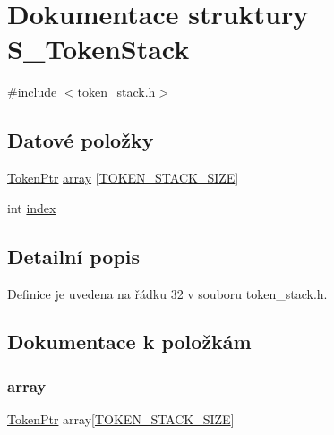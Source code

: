 \hypertarget{struct_s___token_stack}{}\section{Dokumentace struktury S\+\_\+\+Token\+Stack}
\label{struct_s___token_stack}


{\ttfamily \#include $<$token\+\_\+stack.\+h$>$}

\subsection*{Datové položky}
\begin{DoxyCompactItemize}
\item 
\hyperlink{token_8h_aa80161bf9be61c651bc95eafc643d9a5}{Token\+Ptr} \hyperlink{struct_s___token_stack_a873aa0c39fe43dcba06cdd8f8f118820}{array} \mbox{[}\hyperlink{token__stack_8h_a3c32d1802e649600f32177ff081a6e00}{T\+O\+K\+E\+N\+\_\+\+S\+T\+A\+C\+K\+\_\+\+S\+I\+ZE}\mbox{]}
\item 
int \hyperlink{struct_s___token_stack_a750b5d744c39a06bfb13e6eb010e35d0}{index}
\end{DoxyCompactItemize}


\subsection{Detailní popis}


Definice je uvedena na řádku 32 v souboru token\+\_\+stack.\+h.



\subsection{Dokumentace k položkám}
\mbox{\label{struct_s___token_stack_a873aa0c39fe43dcba06cdd8f8f118820}} 
\subsubsection{\texorpdfstring{array}{array}}
{\footnotesize\ttfamily \hyperlink{token_8h_aa80161bf9be61c651bc95eafc643d9a5}{Token\+Ptr} array\mbox{[}\hyperlink{token__stack_8h_a3c32d1802e649600f32177ff081a6e00}{T\+O\+K\+E\+N\+\_\+\+S\+T\+A\+C\+K\+\_\+\+S\+I\+ZE}\mbox{]}}




